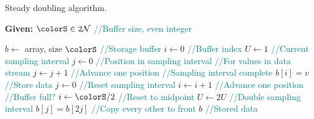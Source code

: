 \begin{algorithm}[H]
\caption{Steady doubling algorithm.}
\label{alg:steady-doubling}
\begin{minipage}{0.5\textwidth}
    \hspace*{\algorithmicindent} \textbf{Given:} $\colorS \in 2\mathcal{N}$ \textcolor{teal}{\small//Buffer size, even integer}
    \hspace*{\algorithmicindent}    \begin{algorithmic}[1]
        \State $b \gets$ array, size $\colorS$ \textcolor{teal}{\small//Storage buffer}
        \State $i \gets 0$ \textcolor{teal}{\small//Buffer index}
        \State $U \gets 1$ \textcolor{teal}{\small//Current sampling interval}
        \State $j \gets 0$ \textcolor{teal}{\small//Position in sampling interval}
         \textcolor{teal}{\small//For values in data stream}
        \State $j \gets j + 1$  \textcolor{teal}{\small//Advance one position}
          \textcolor{teal}{\small//Sampling interval complete}
        \State $b[i] = v$ \textcolor{teal}{\small//Store data}
        \State $j \gets 0$  \textcolor{teal}{\small//Reset sampling interval}
        \State $i \gets i + 1$  \textcolor{teal}{\small//Advance one position}
         \textcolor{teal}{\small//Buffer full?}
        \State $i \gets \colorS / 2$ \textcolor{teal}{\small//Reset to midpoint}
        \State $U \gets 2U$ \textcolor{teal}{\small//Double sampling interval}
        \For{$j \in [0\twodots \colorS/2)$}
        \State $b[j] = b[2j]$ \textcolor{teal}{\small//Copy every other to front}
        \EndFor
        \EndIf
        \EndIf
        \EndFor
        \Return $b$ \textcolor{teal}{\small//Stored data}
    \end{algorithmic}
\end{minipage}
\end{algorithm}
